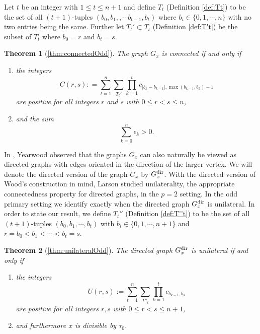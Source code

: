\documentclass{amsart}
\newtheorem*{thm*}{Theorem}
\theoremstyle{definition}
\theoremstyle{plain}
\numberwithin{theorem}{section}
\numberwithin{equation}{section}
\numberwithin{figure}{section}
\newcommand{\0}{\langle 0 \rangle }
\begin{document}
Let $t$ be an integer with $1 \leq t \leq n + 1$ and define $T_t$ { (Definition \ref{def:Tt})} to be the set of all $(t+1)$-tuples $(b_0, b_1, ,\cdots b_{t - 1}, b_t) $ where $b_i \in \{0, 1, \cdots, n\}$ with no two entries being the same.  Further let $T_t' \subset T_t$ (Definition \ref{def:T't}) be the subset of $T_t$ where $b_0 = r$ and $b_t = s$. \color{black}

\begin{thm*}[\cref{thm:connectedOdd}]
    The graph $G_x$ is connected if and only if 
    \begin{enumerate}
        \item the integers 
        \[
        C(r,s) : = \sum_{t = 1}^n \sum_{T_t'} \prod_{k = 1}^t c_{|b_k-b_{k-1}|, \max (b_{k-1}, b_k)-1} 
        \]
        are positive for all integers $r$ and $s$ with $0 \leq r < s \leq n$,
        \item and the sum 
        \[
        \sum_{k=0}^n \epsilon_k > 0.
        \]
    \end{enumerate}
\end{thm*}

In \cite{Yearwood19}, Yearwood observed that the graphs $G_x$ can also naturally be viewed as directed graphs with edges oriented in the direction of the larger vertex. We will denote the directed version of the graph $G_x$ by $G_x^{\textup{dir}}$. With the directed version of Wood's construction in mind, Larson studied unilaterality, the appropriate connectedness property for directed graphs, in the $p = 2$ setting. In the odd primary setting we  identify exactly when the directed graph $G_x^\textup{dir}$ is unilateral. In order to state our result, we define ${T}_t''$ (Definition \ref{def:T''t}) to be the set of all $(t + 1)$-tuples $(b_0, b_1, \cdots, b_t)$ with $b_i \in \{0, 1, \cdots, n + 1\}$ and $r = b_0 < b_1 < \cdots < b_t = s$. \color{black}
\begin{thm*}[\cref{thm:unilateralOdd}]
    The directed graph $G_x^{\textup{dir}}$ is unilateral if and only if 
    \begin{enumerate}
        \item the integers
        \[
        U(r,s) := \sum_{t=1}^{n}\sum_{{T}''_t}\prod_{k=1}^t c_{b_{k-1},b_k}
        \]
        are positive for all integers $r,s$ with $0 \leq r < s \leq n + 1$,
        \item and furthermore $x$ is divisible by $\tau_0$.
    \end{enumerate}
\end{thm*}
\end{document}
